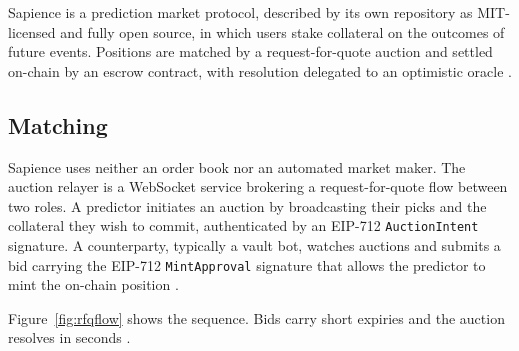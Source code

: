 Sapience is a prediction market protocol, described by its own repository as MIT-licensed
and fully open source, in which users stake collateral on
the outcomes of future events. Positions are matched by a request-for-quote auction and
settled on-chain by an escrow contract, with resolution delegated to an optimistic oracle
\cite{sapience2026relayer}.

\subsection{Matching}

Sapience uses neither an order book nor an automated market maker. The auction relayer is a
WebSocket service brokering a request-for-quote flow between two roles. A predictor
initiates an auction by broadcasting their picks and the collateral they wish to commit,
authenticated by an EIP-712 \texttt{AuctionIntent} signature. A counterparty, typically a
vault bot, watches auctions and submits a bid carrying the EIP-712 \texttt{MintApproval}
signature that allows the predictor to mint the on-chain position
\cite{sapience2026relayer}.

Figure~\ref{fig:rfqflow} shows the sequence. Bids carry short expiries and the auction
resolves in seconds \cite{sapience2026docs}.

